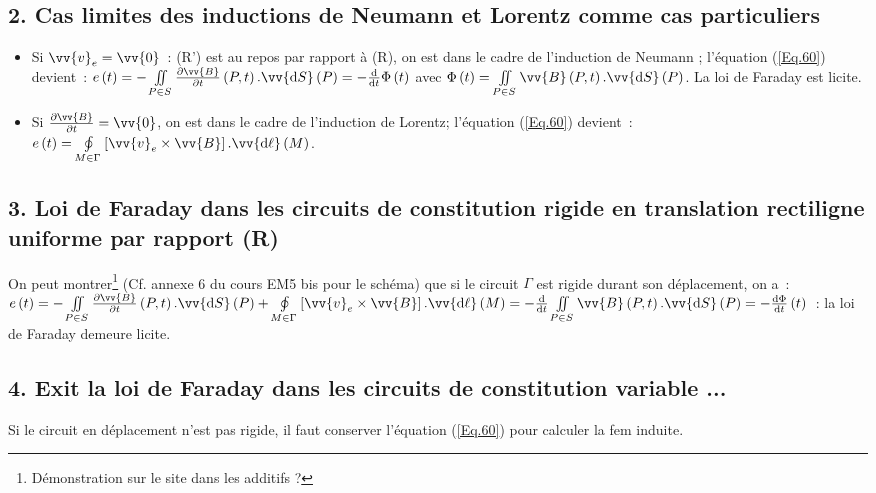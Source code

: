 \documentclass{article}
\let\oldiint\iint
\renewcommand{\iint}{\oldiint\limits}
\let\oldoint\oint
\renewcommand{\oint}{\oldoint\limits}
\renewcommand\overrightarrow{\vv}
\begin{document}
\subsection*{2. Cas limites des inductions de Neumann et Lorentz comme
cas particuliers}\begin{itemize}
\item Si $\overrightarrow{v}_{e} = \overrightarrow{0}$ : (R') est au
repos par rapport à (R), on est dans le cadre de l'induction de
Neumann ; l'équation (\ref{Eq.60}) devient : $e\left(t\right) = -\iint_{P\in
S}\frac{\partial\overrightarrow{B}}{\partial
t}\left(P,t\right).\overrightarrow{\mathrm{d}S}\left(P\right)= -\frac{\mathrm{d}}{\mathrm{d}t}\Phi\left(t\right)$ avec $\Phi\left(t\right)
= \iint_{P\in S}\overrightarrow{B}\left(P,t\right).\overrightarrow{\mathrm{d}S}\left(P\right)$. La
loi de Faraday est licite.
\item Si $\frac{\partial \overrightarrow{B}}{\partial t} =
\overrightarrow{0}$, on est dans le cadre de l'induction de Lorentz;
l'équation (\ref{Eq.60}) devient : $e\left(t\right) = \oint_{M\in
\Gamma}\left[\overrightarrow{v}_{e}\times
\overrightarrow{B}\right].\overrightarrow{\mathrm{d}\ell}\left(M\right)$.
\end{itemize}

\subsection*{3. Loi de Faraday dans les circuits de constitution rigide en translation rectiligne uniforme par rapport (R)}
On peut montrer\footnote{Démonstration sur le site dans les additifs
?} (Cf. annexe 6 du cours EM5 bis pour le schéma) que si le circuit
$\Gamma$ est rigide durant son déplacement, on a : $e\left(t\right) =
-\iint_{P\in S}\frac{\partial\overrightarrow{B}}{\partial
t}\left(P,t\right).\overrightarrow{\mathrm{d}S}\left(P\right) +\oint_{M\in
\Gamma}\left[\overrightarrow{v}_{e}\times
\overrightarrow{B}\right].\overrightarrow{\mathrm{d}\ell}\left(M\right) =
-\frac{\mathrm{d}}{\mathrm{d}t}\iint_{P\in
S}\overrightarrow{B}\left(P,t\right).\overrightarrow{\mathrm{d}S}\left(P\right) = -\frac{\mathrm{d}\Phi}{\mathrm{d}t}\left(t\right)$ : la loi de Faraday demeure licite.

\subsection*{4. Exit la loi de Faraday dans les circuits de constitution
variable ...}
Si le circuit en déplacement n'est pas rigide, il faut conserver
l'équation (\ref{Eq.60}) pour calculer la fem induite.
\end{document}
